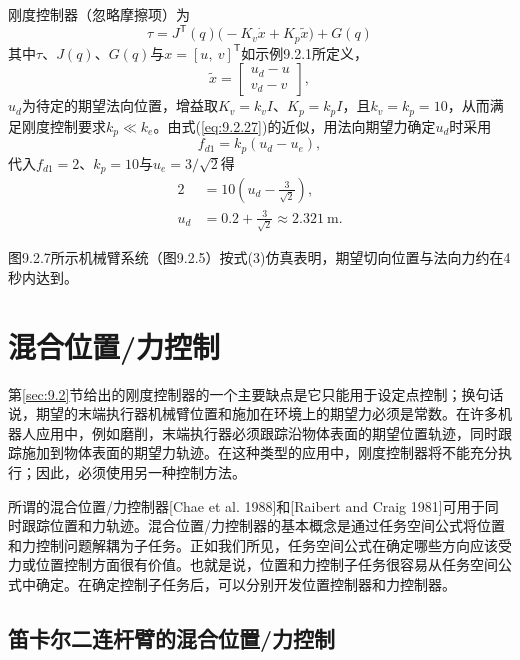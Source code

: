 \documentclass[12pt,a4paper]{ctexart}
\begin{document}
刚度控制器（忽略摩擦项）为
\begin{equation}\tag{3}
\tau = J^{\mathsf T}(q)\bigl(-K_v\dot{x} + K_p\tilde{x}\bigr) + G(q)
\end{equation}
其中$\tau$、$J(q)$、$G(q)$与$x=[u,\ v]^{\mathsf T}$如示例9.2.1所定义，
\begin{equation*}
\tilde{x} = \begin{bmatrix} u_d - u \\ v_d - v \end{bmatrix},
\end{equation*}
$u_d$为待定的期望法向位置，增益取$K_v = k_v I$、$K_p = k_p I$，且$k_v = k_p = 10$，从而满足刚度控制要求$k_p \ll k_e$。由式(\ref{eq:9.2.27})的近似，用法向期望力确定$u_d$时采用
\begin{equation}\tag{4}
f_{d1} = k_p(u_d - u_e),
\end{equation}
代入$f_{d1} = 2$、$k_p = 10$与$u_e = 3/\sqrt{2}$得
\begin{align*}
2 &= 10\left(u_d - \frac{3}{\sqrt{2}}\right), \\
u_d &= 0.2 + \frac{3}{\sqrt{2}} \approx 2.321\ \mathrm{m}.
\end{align*}

图9.2.7所示机械臂系统（图9.2.5）按式(3)仿真表明，期望切向位置与法向力约在4秒内达到。

\section{混合位置/力控制}\label{sec:9.3}

第\ref{sec:9.2}节给出的刚度控制器的一个主要缺点是它只能用于设定点控制；换句话说，期望的末端执行器机械臂位置和施加在环境上的期望力必须是常数。在许多机器人应用中，例如磨削，末端执行器必须跟踪沿物体表面的期望位置轨迹，同时跟踪施加到物体表面的期望力轨迹。在这种类型的应用中，刚度控制器将不能充分执行；因此，必须使用另一种控制方法。

所谓的混合位置/力控制器[Chae et al. 1988]和[Raibert and Craig 1981]可用于同时跟踪位置和力轨迹。混合位置/力控制器的基本概念是通过任务空间公式将位置和力控制问题解耦为子任务。正如我们所见，任务空间公式在确定哪些方向应该受力或位置控制方面很有价值。也就是说，位置和力控制子任务很容易从任务空间公式中确定。在确定控制子任务后，可以分别开发位置控制器和力控制器。

\subsection{笛卡尔二连杆臂的混合位置/力控制}
\end{document}
